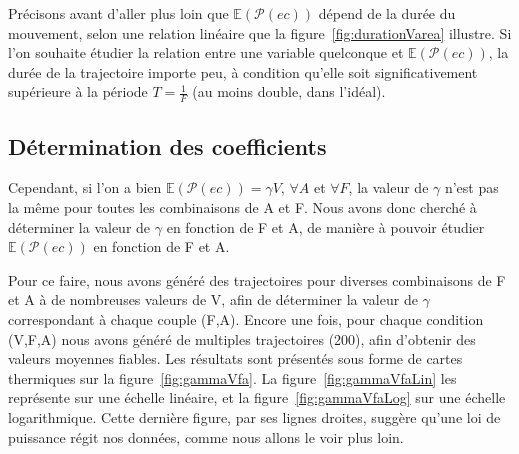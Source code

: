 	Précisons avant d'aller plus loin que $\mathbb{E}(\mathcal{P}(ec))$ dépend de la durée du mouvement, selon une relation linéaire que la figure~\ref{fig:durationVarea} illustre. Si l'on souhaite étudier la relation entre une variable quelconque et $\mathbb{E}(\mathcal{P}(ec))$, la durée de la trajectoire importe peu, à condition qu'elle soit significativement supérieure à la période $T = \frac{1}{F}$ (au moins double, dans l'idéal).
	
	\subsection{Détermination des coefficients}
	Cependant, si l'on a bien $\mathbb{E}(\mathcal{P}(ec)) = \gamma{}V$, $\forall A$ et $\forall F$, la valeur de $\gamma$ n'est pas la même pour toutes les combinaisons de A et F. Nous avons donc cherché à déterminer la valeur de $\gamma$ en fonction de F et A, de manière à pouvoir étudier $\mathbb{E}(\mathcal{P}(ec))$ en fonction de F et A.
	
	Pour ce faire, nous avons généré des trajectoires pour diverses combinaisons de F et A à de nombreuses valeurs de V, afin de déterminer la valeur de $\gamma$ correspondant à chaque couple (F,A). Encore une fois, pour chaque condition (V,F,A) nous avons généré de multiples trajectoires (200), afin d'obtenir des valeurs moyennes fiables. Les résultats sont présentés sous forme de cartes thermiques sur la figure~\ref{fig:gammaVfa}. La figure~\ref{fig:gammaVfaLin} les représente sur une échelle linéaire, et la figure~\ref{fig:gammaVfaLog} sur une échelle logarithmique. Cette dernière figure, par ses lignes droites, suggère qu'une loi de puissance régit nos données, comme nous allons le voir plus loin.
	
